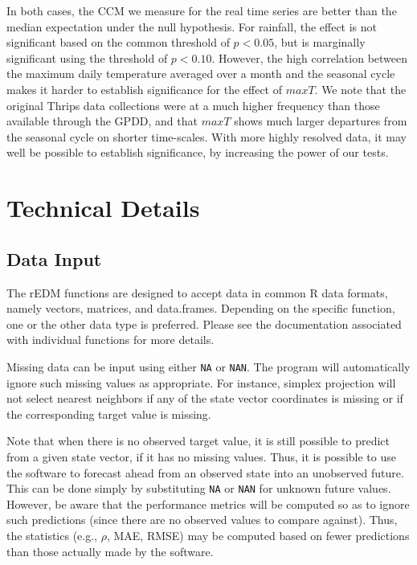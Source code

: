 In both cases, the CCM we measure for the real time series are better than the median expectation under the null hypothesis. For rainfall, the effect is not significant based on the common threshold of $p < 0.05$, but is marginally significant using the threshold of $p < 0.10$. However, the high correlation between the maximum daily temperature averaged over a month and the seasonal cycle makes it harder to establish significance for the effect of $maxT$. We note that the original Thrips data collections were at a much higher frequency than those available through the GPDD, and that $maxT$ shows much larger departures from the seasonal cycle on shorter time-scales. With more highly resolved data, it may well be possible to establish significance, by increasing the power of our tests.

\section{Technical Details}

\subsection{Data Input}

The rEDM functions are designed to accept data in common R data formats, namely vectors, matrices, and data.frames. Depending on the specific function, one or the other data type is preferred. Please see the documentation associated with individual functions for more details.

Missing data can be input using either \lstinline{NA} or \lstinline{NAN}. The program will automatically ignore such missing values as appropriate. For instance, simplex projection will not select nearest neighbors if any of the state vector coordinates is missing or if the corresponding target value is missing.

Note that when there is no observed target value, it is still possible to predict from a given state vector, if it has no missing values. Thus, it is possible to use the software to forecast ahead from an observed state into an unobserved future. This can be done simply by substituting \lstinline{NA} or \lstinline{NAN} for unknown future values. However, be aware that the performance metrics will be computed so as to ignore such predictions (since there are no observed values to compare against). Thus, the statistics (e.g., $\rho$, MAE, RMSE) may be computed based on fewer predictions than those actually made by the software.

